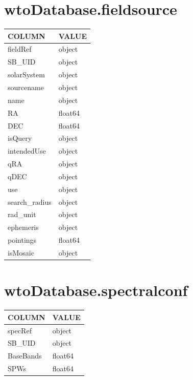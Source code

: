 \documentclass[a4paper,10pt,english]{sphinxmanual}
\begin{document}
\section{wtoDatabase.fieldsource}
\label{wtodata:wtodatabase-fieldsource}
\begin{tabulary}{\linewidth}{|L|L|}
\hline
\textsf{\relax 
COLUMN
} & \textsf{\relax 
VALUE
}\\
\hline
fieldRef
 & 
object
\\

SB\_UID
 & 
object
\\

solarSystem
 & 
object
\\

sourcename
 & 
object
\\

name
 & 
object
\\

RA
 & 
float64
\\

DEC
 & 
float64
\\

isQuery
 & 
object
\\

intendedUse
 & 
object
\\

qRA
 & 
object
\\

qDEC
 & 
object
\\

use
 & 
object
\\

search\_radius
 & 
object
\\

rad\_unit
 & 
object
\\

ephemeris
 & 
object
\\

pointings
 & 
float64
\\

isMosaic
 & 
object
\\
\hline\end{tabulary}



\section{wtoDatabase.spectralconf}
\label{wtodata:wtodatabase-spectralconf}
\begin{tabulary}{\linewidth}{|L|L|}
\hline
\textsf{\relax 
COLUMN
} & \textsf{\relax 
VALUE
}\\
\hline
specRef
 & 
object
\\

SB\_UID
 & 
object
\\

BaseBands
 & 
float64
\\

SPWs
 & 
float64
\\
\hline\end{tabulary}
\end{document}
